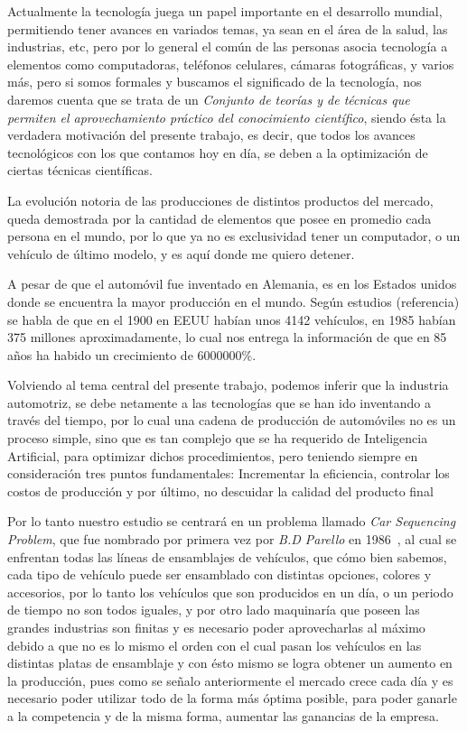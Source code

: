 Actualmente la tecnología juega un papel importante en el desarrollo mundial,
permitiendo tener avances en variados temas, ya sean en el área de la salud,
las industrias, etc, pero por lo general el común de las personas asocia
tecnología a elementos como computadoras, teléfonos celulares, cámaras fotográficas,
y varios más, pero si somos formales y buscamos el significado de la tecnología,
nos daremos cuenta que se trata de un \emph{Conjunto de teorías y de técnicas que permiten
el aprovechamiento práctico del conocimiento científico}, siendo ésta la verdadera
motivación del presente trabajo, es decir, que todos los avances tecnológicos
con los que contamos hoy en día, se deben a la optimización de ciertas técnicas científicas.

La evolución notoria de las producciones de distintos productos del mercado, queda demostrada
por la cantidad de elementos que posee en promedio cada persona en el mundo, por lo que ya no es
exclusividad tener un computador, o un vehículo de último modelo, y es aquí donde me quiero detener.

A pesar de que el automóvil fue inventado en Alemania, es en los Estados unidos donde se encuentra
la mayor producción en el mundo. Según estudios (referencia) se habla de que en el 1900 en EEUU habían
unos 4142 vehículos, en 1985 habían 375 millones aproximadamente, lo cual nos entrega la información
de que en 85 años ha habido un crecimiento de 6000000\%.

Volviendo al tema central del presente trabajo, podemos inferir que la industria automotriz,
se debe netamente a las tecnologías que se han ido inventando a través del tiempo, por lo cual
una cadena de producción de automóviles no es un proceso simple, sino que es tan complejo
que se ha requerido de Inteligencia Artificial, para optimizar dichos procedimientos,
pero teniendo siempre en consideración tres puntos fundamentales: Incrementar la eficiencia,
controlar los costos de producción y por último, no descuidar la calidad del producto final

Por lo tanto nuestro estudio se centrará en un problema llamado \emph{Car Sequencing Problem},
que fue nombrado por primera vez por \emph{B.D Parello} en 1986~\cite{parello}, al cual se enfrentan
todas las líneas de ensamblajes de vehículos, que cómo bien sabemos, cada tipo de vehículo puede ser ensamblado
con distintas opciones, colores y accesorios, por lo tanto los vehículos que son producidos en un día,
o un periodo de tiempo no son todos iguales, y por otro lado maquinaría que poseen las grandes industrias son
finitas y es necesario poder aprovecharlas al máximo debido a que no es lo mismo el orden con el cual pasan
los vehículos en las distintas platas de ensamblaje y con ésto mismo se logra obtener un aumento en la producción, pues como
se señalo anteriormente el mercado crece cada día y es necesario poder utilizar todo de la forma
más óptima posible, para poder ganarle a la competencia y de la misma forma, aumentar las ganancias
de la empresa.

